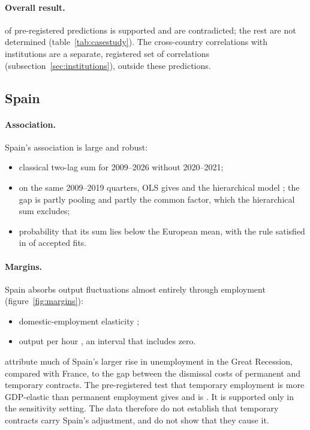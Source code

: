 \paragraph{Overall result.}  of  pre-registered predictions
is supported and  are contradicted; the rest are not determined
(table~\ref{tab:casestudy}). The cross-country correlations with institutions are a
separate, registered set of  correlations (subsection~\ref{sec:institutions}),
outside these  predictions.

\subsection{Spain}

\paragraph{Association.} Spain's association is large and robust:
\begin{itemize}
  \item classical two-lag sum   for 2009--2026 without
    2020--2021;
  \item on the same 2009--2019 quarters, OLS gives  and the hierarchical
    model  ; the gap is partly pooling and partly the common
    factor, which the hierarchical sum excludes;
  \item probability  that its sum lies below the European mean, with the
    rule satisfied in  of  accepted fits.
\end{itemize}

\paragraph{Margins.} Spain absorbs output fluctuations almost entirely through
employment (figure~\ref{fig:margins}):
\begin{itemize}
  \item domestic-employment elasticity  ;
  \item output per hour  , an interval that includes
    zero.
\end{itemize}
\citet{bentolila2012twotier} attribute much of Spain's larger rise in unemployment in the
Great Recession, compared with France, to the gap between the dismissal costs of permanent
and temporary contracts. The pre-registered test that temporary employment is more
GDP-elastic than permanent employment gives   and is
. It is supported only in the  sensitivity
setting. The data therefore do not establish that temporary contracts carry Spain's
adjustment, and do not show that they cause it.


